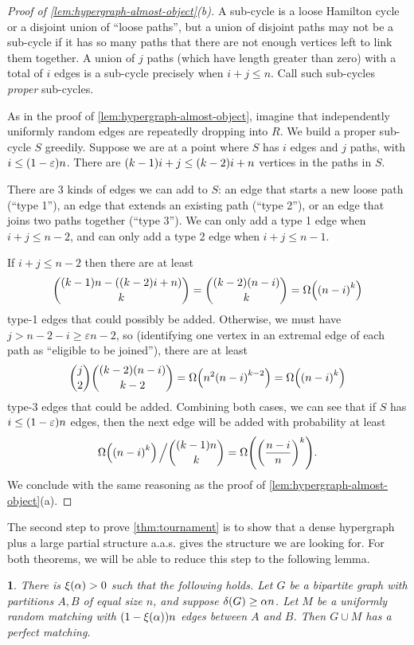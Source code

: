 \documentclass[11pt,english]{article}
\theoremstyle{plain}
\theoremstyle{definition}
\theoremstyle{definition}
\theoremstyle{plain}
\theoremstyle{plain}
\theoremstyle{plain}
\newtheorem{lem}[thm]{\protect\lemmaname}
\theoremstyle{plain}
\theoremstyle{remark}
\theoremstyle{remark}
\let\originalleft\left
\let\originalright\right
\renewcommand{\left}{\mathopen{}\mathclose\bgroup\originalleft}
\renewcommand{\right}{\aftergroup\egroup\originalright}
\providecommand{\lemmaname}{Lemma}
\begin{document}
\begin{proof}
[Proof of \ref{lem:hypergraph-almost-object}(b)]A sub-cycle is a
loose Hamilton cycle or a disjoint union of ``loose paths'', but
a union of disjoint paths may not be a sub-cycle if it has so many
paths that there are not enough vertices left to link them together.
A union of $j$ paths (which have length greater than zero) with a
total of $i$ edges is a sub-cycle precisely when $i+j\le n$. Call
such sub-cycles \emph{proper }sub-cycles.

As in the proof of \ref{lem:hypergraph-almost-object}, imagine that
independently uniformly random edges are repeatedly dropping into
$R$. We build a proper sub-cycle $S$ greedily. Suppose we are at
a point where $S$ has $i$ edges and $j$ paths, with $i\le\left(1-\varepsilon\right)n$.
There are $\left(k-1\right)i+j\le\left(k-2\right)i+n$ vertices in
the paths in $S$. 

There are 3 kinds of edges we can add to $S$: an edge that starts
a new loose path (``type 1''), an edge that extends an existing
path (``type 2''), or an edge that joins two paths together (``type
3''). We can only add a type 1 edge when $i+j\le n-2$, and can only
add a type 2 edge when $i+j\le n-1$.

If $i+j\le n-2$ then there are at least 
\[
{\left(k-1\right)n-\left(\left(k-2\right)i+n\right) \choose k}={\left(k-2\right)\left(n-i\right) \choose k}=\Omega\left(\left(n-i\right)^{k}\right)
\]
type-1 edges that could possibly be added. Otherwise, we must have
$j>n-2-i\ge\varepsilon n-2$, so (identifying one vertex in an extremal
edge of each path as ``eligible to be joined''), there are at least
\[
{j \choose 2}{\left(k-2\right)\left(n-i\right) \choose k-2}=\Omega\left(n^{2}\left(n-i\right)^{k-2}\right)=\Omega\left(\left(n-i\right)^{k}\right)
\]
type-3 edges that could be added. Combining both cases, we can see
that if $S$ has $i\le\left(1-\varepsilon\right)n$ edges, then the
next edge will be added with probability at least
\[
\Omega\left(\left(n-i\right)^{k}\right)\left.\vphantom{\sum}\right/{\left(k-1\right)n \choose k}=\Omega\left(\left(\frac{n-i}{n}\right)^{k}\right).
\]
We conclude with the same reasoning as the proof of \ref{lem:hypergraph-almost-object}(a).
\end{proof}
The second step to prove \ref{thm:tournament} is to show that a dense
hypergraph plus a large partial structure a.a.s. gives the structure
we are looking for. For both theorems, we will be able to reduce this
step to the following lemma.
\begin{lem}
\label{lem:bipartite-plus-big-matching-perfect}There is $\xi\left(\alpha\right)>0$
such that the following holds. Let $G$ be a bipartite graph with
partitions $A,B$ of equal size $n$, and suppose $\delta\left(G\right)\ge\alpha n$.
Let $M$ be a uniformly random matching with $\left(1-\xi\left(\alpha\right)\right)n$
edges between $A$ and $B$. Then $G\cup M$ has a perfect matching.
\end{lem}
\end{document}
